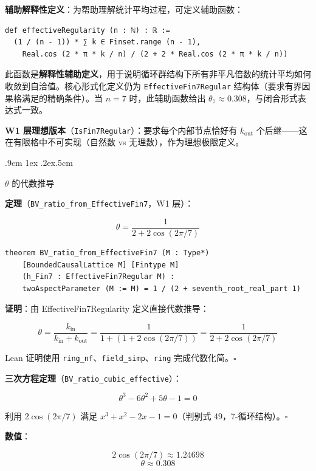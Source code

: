 \documentclass[aps,prd,twocolumn,nofootinbib,floatfix]{revtex4-2}
\makeatletter
\def\subsection{%
  \@startsection{subsection}{2}{\z@}
    {.9cm \@plus1ex \@minus .2ex}{.5cm}
    {\normalfont\large\bfseries\raggedright}%
}
\makeatother
\begin{document}
\textbf{辅助解释性定义}：为帮助理解统计平均过程，可定义辅助函数：

{\scriptsize\begin{verbatim}
def effectiveRegularity (n : ℕ) : ℝ :=
  (1 / (n - 1)) * ∑ k ∈ Finset.range (n - 1),
    Real.cos (2 * π * k / n) / (2 + 2 * Real.cos (2 * π * k / n))
\end{verbatim}}

此函数是\textbf{解释性辅助定义}，用于说明循环群结构下所有非平凡倍数的统计平均如何收敛到自洽值。核心形式化定义仍为 \texttt{EffectiveFin7Regular} 结构体（要求有界因果格满足的精确条件）。当 $n = 7$ 时，此辅助函数给出 $\theta_7 \approx 0.308$，与闭合形式表达式一致。

\textbf{W1 层理想版本}（\texttt{IsFin7Regular}）：要求每个内部节点恰好有 $k_{\text{out}}$ 个后继——这在有限格中不可实现（自然数 vs 无理数），作为理想极限定义。

\subsection{$\theta$ 的代数推导}

\textbf{定理}（\texttt{BV\_ratio\_from\_EffectiveFin7}，W1 层）：

\[
\theta = \frac{1}{2 + 2\cos(2\pi/7)}
\]

{\scriptsize\begin{verbatim}
theorem BV_ratio_from_EffectiveFin7 (M : Type*)
    [BoundedCausalLattice M] [Fintype M]
    (h_Fin7 : EffectiveFin7Regular M) :
    twoAspectParameter (M := M) = 1 / (2 + seventh_root_real_part 1)
\end{verbatim}}

\textbf{证明}：由 EffectiveFin7Regularity 定义直接代数推导：

\[
\theta = \frac{k_{\text{in}}}{k_{\text{in}} + k_{\text{out}}} = \frac{1}{1 + (1 + 2\cos(2\pi/7))} = \frac{1}{2 + 2\cos(2\pi/7)}
\]

Lean 证明使用 \texttt{ring\_nf}、\texttt{field\_simp}、\texttt{ring} 完成代数化简。$\square$

\textbf{三次方程定理}（\texttt{BV\_ratio\_cubic\_effective}）：

\[
\theta^3 - 6\theta^2 + 5\theta - 1 = 0
\]

利用 $2\cos(2\pi/7)$ 满足 $x^3 + x^2 - 2x - 1 = 0$（判别式 49，7-循环结构）。$\square$

\textbf{数值}：

\[
2\cos(2\pi/7) \approx 1.24698
\]
\[
\theta \approx 0.308
\]
\end{document}
